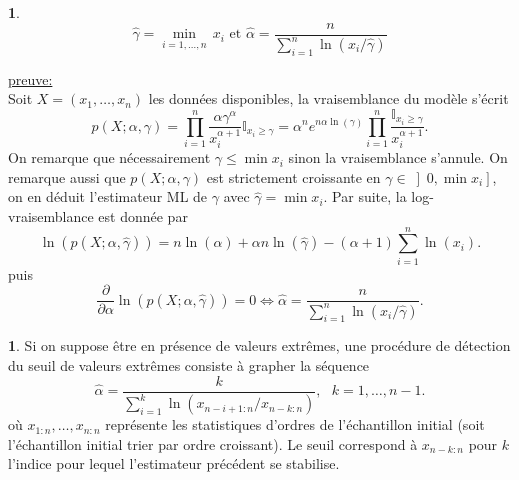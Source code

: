 \documentclass[8pt,notheorems]{beamer}
\newtheorem{prop}{\translate{Proposition}}
\theoremstyle{definition}
\theoremstyle{example}
\newtheorem{example}{\translate{Example}}
\theoremstyle{mystyle}
\theoremstyle{plain}
\begin{document}
\begin{frame}[allowframebreaks]
\begin{prop}
$$
\widehat{\gamma}=\underset{i=1,\ldots, n}{\min}\, x_i \text{ et }\widehat{\alpha}=\frac{n}{\sum_{i=1}^n\ln(x_i/ \widehat{\gamma})}
$$
\end{prop}
\underline{preuve:}\\
Soit $X = (x_1,\ldots, x_n)$ les données disponibles, la vraisemblance du modèle s'écrit
$$
p(X;\alpha,\gamma)=\prod_{i=1}^{n}\frac{\alpha\gamma^{\alpha}}{x_i^{\alpha+1}}\mathbb{I}_{x_i\geq\gamma}=\alpha^ne^{n\alpha\ln(\gamma)}\prod_{i=1}^{n}\frac{\mathbb{I}_{x_i\geq\gamma}}{x_i^{\alpha+1}}.
$$
On remarque que nécessairement $\gamma\leq \min x_i$ sinon la vraisemblance s'annule. On remarque aussi que $p(X;\alpha,\gamma)$ est strictement croissante en $\gamma\in \left]0,\min x_i\right]$, on en déduit l'estimateur ML de $\gamma$ avec $\widehat{\gamma} =\min x_i$. Par suite, la log-vraisemblance est donnée par
$$
\ln(p(X;\alpha,\widehat{\gamma})) = n\ln(\alpha)+\alpha n\ln(\widehat{\gamma})-(\alpha+1)\sum_{i =1}^n\ln(x_i).
$$
puis
$$
\frac{\partial}{\partial \alpha}\ln(p(X;\alpha,\widehat{\gamma})) = 0 \Leftrightarrow \widehat{\alpha} = \frac{n}{\sum_{i =1}^n\ln(x_i/\widehat{\gamma})}.
$$
\begin{example}
Si on suppose être en présence de valeurs extrêmes, une procédure de détection du seuil de valeurs extrêmes consiste à grapher la séquence
$$
\widehat{\alpha}=\frac{k}{\sum_{i=1}^k\ln(x_{n-i+1:n}/ x_{n-k:n})},\text{ }k = 1,\ldots, n-1.
$$
où $x_{1:n},\ldots, x_{n:n}$ représente les statistiques d'ordres de l'échantillon initial (soit l'échantillon initial trier par ordre croissant). Le seuil correspond à $x_{n-k:n}$ pour $k$ l'indice pour lequel l'estimateur précédent se stabilise.
\end{example}

\end{frame}
\end{document}
